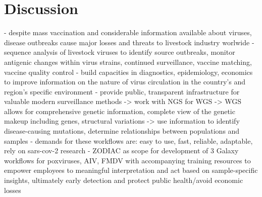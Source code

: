 \chapter{Discussion}\label{chap:discussion}
- despite mass vaccination and considerable information available about viruses, disease outbreaks cause major losses and threats to livestock industry worlwide
- sequence analysis of livestock viruses to identify source outbreaks, monitor antigenic changes within virus strains, continued surveillance, vaccine matching, vaccine quality control
- build capacities in diagnostics, epidemiology, economics to improve information on the nature of virus circulation in the country's and region's specific environment
- provide public, transparent infrastructure for valuable modern surveillance methods -> work with NGS for WGS -> WGS allows for comprehensive genetic information, complete view of the genetic makeup including genes, structural variations -> use information to identify disease-causing mutations, determine relationships between populations and samples
- demands for these workflows are: easy to use, fast, reliable, adaptable, rely on sars-cov-2 research
- ZODIAC as scope for development of 3 Galaxy workflows for poxviruses, AIV, FMDV with accompanying training resources to empower employees to meaningful interpretation and act based on sample-specific insights, ultimately early detection and protect public health/avoid economic losses

